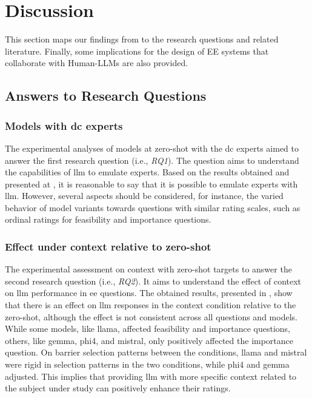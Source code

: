 \documentclass[manuscript,review,anonymous]{acmart}
\begin{document}
\section{Discussion}  \label{sec:discussion}
This section maps our findings from  to the research questions and related literature. Finally, some implications for the design of EE systems that collaborate with Human-LLMs are also provided. 

\subsection{Answers to Research Questions}

\subsubsection{Models with \gls{dc} experts}
The experimental analyses of models at zero-shot with the \gls{dc} experts aimed to answer the first research question (i.e., \textit{RQ1}). The question aims to understand the capabilities of \gls{llm} to emulate experts. Based on the results obtained and presented at , it is reasonable to say that it is possible to emulate experts with \gls{llm}. However, several aspects should be considered, for instance, the varied behavior of model variants towards questions with similar rating scales, such as ordinal ratings for feasibility and importance questions. 

\subsubsection{Effect under context relative to zero-shot}
The experimental assessment on context with zero-shot targets to answer the second research question (i.e., \textit{RQ2}). It aims to understand the effect of context on \gls{llm} performance in \gls{ee} questions. The obtained results, presented in , show that there is an effect on \gls{llm} responses in the context condition relative to the zero-shot, although the effect is not consistent across all questions and models. While some models, like \gls{llama}, affected feasibility and importance questions, others, like \gls{gemma}, \gls{phi4}, and \gls{mistral}, only positively affected the importance question. On barrier selection patterns between the conditions, \gls{llama} and \gls{mistral} were rigid in selection patterns in the two conditions, while \gls{phi4} and \gls{gemma} adjusted. This implies that providing \gls{llm} with more specific context related to the subject under study can positively enhance their ratings. 
\end{document}
